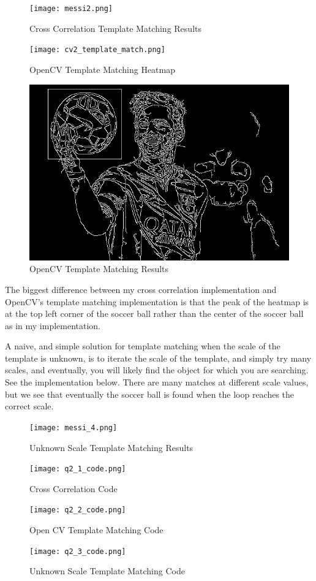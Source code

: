 \documentclass[12pt, letterpaper]{article}
\begin{document}
\begin{figure}[H]
    \centering
    \texttt{[image: messi2.png]}
    \caption{Cross Correlation Template Matching Results}
\end{figure}

\begin{figure}[H]
    \centering
    \texttt{[image: cv2\_template\_match.png]}
    \caption{OpenCV Template Matching Heatmap}
\end{figure}

\begin{figure}[H]
    \centering
    \includegraphics[width=\textwidth]{messi3.png}
    \caption{OpenCV Template Matching Results}
\end{figure}

The biggest difference between my cross correlation implementation and OpenCV's template matching implementation is that the peak of the heatmap is at the top left corner of the soccer ball rather than the center of the soccer ball as in my implementation.

A naive, and simple solution for template matching when the scale of the template is unknown, is to iterate the scale of the template, and simply try many scales, and eventually, you will likely find the object for which you are searching. See the implementation below. There are many matches at different scale values, but we see that eventually the soccer ball is found when the loop reaches the correct scale. 
\begin{figure}[H]
    \centering
    \texttt{[image: messi\_4.png]}
    \caption{Unknown Scale Template Matching Results}
\end{figure}

\begin{figure}[H]
    \centering
    \texttt{[image: q2\_1\_code.png]}
    \caption{Cross Correlation Code}
\end{figure}

\begin{figure}[H]
    \centering
    \texttt{[image: q2\_2\_code.png]}
    \caption{Open CV Template Matching Code}
\end{figure}

\begin{figure}[H]
    \centering
    \texttt{[image: q2\_3\_code.png]}
    \caption{Unknown Scale Template Matching Code}
\end{figure}
\end{document}
